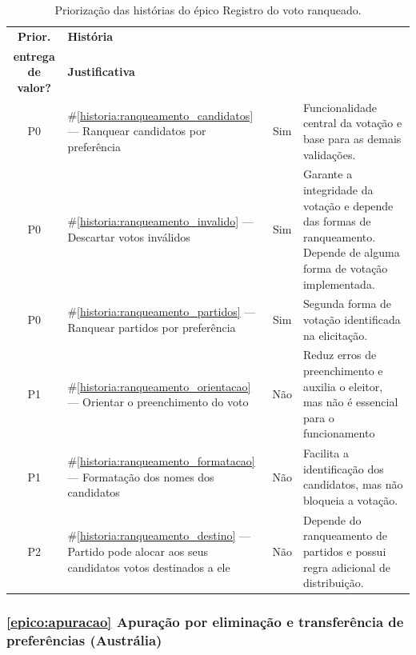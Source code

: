 \documentclass[12pt,a4paper]{article}
\newcounter{epico}
\newcounter{historia}
\begin{document}
\begin{table}[H]
\centering
\small
\begin{tabular}{|c|m{3.4cm}|c|m{6.7cm}|}
\hline
\rowcolor[gray]{0.9}
\textbf{Prior.} &
\textbf{História} &
\makecell{\textbf{Incluído na primeira}\\
\textbf{entrega de valor?}} &
\textbf{Justificativa} \\
\hline

P0 &
\#\ref{historia:ranqueamento_candidatos} --- Ranquear candidatos por preferência &
Sim &
Funcionalidade central da votação e base para as demais validações. \\

\hline
P0 &
\#\ref{historia:ranqueamento_invalido} --- Descartar votos inválidos &
Sim &
Garante a integridade da votação e depende das formas de ranqueamento. Depende de alguma forma de votação implementada.  \\

\hline
P0 &
\#\ref{historia:ranqueamento_partidos} --- Ranquear partidos por preferência &
Sim &
Segunda forma de votação identificada na elicitação. \\

\hline
P1 &
\#\ref{historia:ranqueamento_orientacao} --- Orientar o preenchimento do voto &
Não &
Reduz erros de preenchimento e auxilia o eleitor, mas não é essencial para o funcionamento \\

\hline
P1 &
\#\ref{historia:ranqueamento_formatacao} --- Formatação dos nomes dos candidatos &
Não &
Facilita a identificação dos candidatos, mas não bloqueia a votação. \\

\hline
P2 &
\#\ref{historia:ranqueamento_destino} --- Partido pode alocar aos seus candidatos votos destinados a ele &
Não &
Depende do ranqueamento de partidos e possui regra adicional de distribuição. \\

\hline
\end{tabular}
\caption{Priorização das histórias do épico Registro do voto ranqueado.}
\end{table}

\subsubsection{\ref{epico:apuracao} Apuração por eliminação e transferência de preferências (Austrália)}
\end{document}
